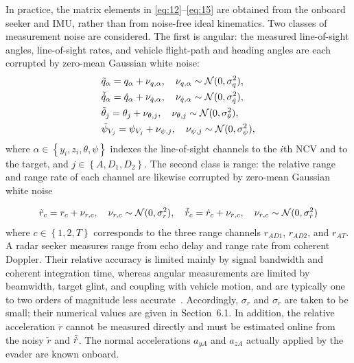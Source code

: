 \begin{assumption}
\label{asm:meas-noise}
In practice, the matrix elements in \eqref{eq:12}--\eqref{eq:15} are obtained from the onboard seeker and IMU, rather than from noise-free ideal kinematics. Two classes of measurement noise are considered. The first is angular: the measured line-of-sight angles, line-of-sight rates, and vehicle flight-path and heading angles are each corrupted by zero-mean Gaussian white noise:
\begin{equation}
\label{eq:16}
\begin{gathered}
  \tilde{q}_{\alpha} = {q_{\alpha}} + {\nu _{q,\alpha }},\quad {\nu _{q,\alpha }}\sim \mathcal{N}(0,\sigma _q^2), \hfill \\
  \tildedot{q}_{\alpha} = \dot{q}_{\alpha} + {\nu _{\dot q,\alpha }},\quad {\nu _{\dot q,\alpha }}\sim \mathcal{N}(0,\sigma _{\dot q}^2), \hfill \\
  \tilde{\theta}_{j} = {\theta _{j}} + {\nu _{\theta ,j}},\quad {\nu _{\theta ,j}}\sim \mathcal{N}(0,\sigma _\theta ^2), \hfill \\
  \tilde{\psi}_{V_{j}} = {\psi _{V_{j}}} + {\nu _{\psi ,j}},\quad {\nu _{\psi ,j}}\sim \mathcal{N}(0,\sigma _\psi ^2), \hfill \\ 
\end{gathered}
\end{equation}
where $\alpha  \in \left\{ {{y_i},{z_i},\theta ,\psi } \right\}$ indexes the line-of-sight channels to the $i$th NCV and to the target, and $j \in \left\{ {A,{D_1},{D_2}} \right\}$. The second class is range: the relative range and range rate of each channel are likewise corrupted by zero-mean Gaussian white noise

\begin{equation}
\label{eq:16b}
\tilde{r}_{c} = {r_c} + {\nu _{r,c}},\quad {\nu _{r,c}}\sim \mathcal{N}(0,\sigma _r^2),\quad
\tilde{\dot{r}}_{c} = {\dot r_c} + {\nu _{\dot r,c}},\quad {\nu _{\dot r,c}}\sim \mathcal{N}(0,\sigma _{\dot r}^2)
\end{equation}
where $c \in \left\{ {1,2,T} \right\}$ corresponds to the three range channels ${r_{AD1}}$, ${r_{AD2}}$, and ${r_{AT}}$. A radar seeker measures range from echo delay and range rate from coherent Doppler. Their relative accuracy is limited mainly by signal bandwidth and coherent integration time, whereas angular measurements are limited by beamwidth, target glint, and coupling with vehicle motion, and are typically one to two orders of magnitude less accurate~\cite{skolnik2008}. Accordingly, ${\sigma _r}$ and ${\sigma _{\dot r}}$ are taken to be small; their numerical values are given in Section~6.1. In addition, the relative acceleration $\ddot{r}$ cannot be measured directly and must be estimated online from the noisy $\tilde{r}$ and $\tilde{\dot{r}}$. The normal accelerations ${a_{yA}}$ and ${a_{zA}}$ actually applied by the evader are known onboard.


\end{assumption}
